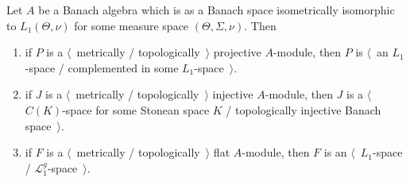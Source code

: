 \begin{proposition}\label{TopProjInjFlatModOverL1Charac} Let $A$ be a Banach
algebra which is as a Banach space isometrically isomorphic to $L_1(\Theta,\nu)$
for some measure space $(\Theta,\Sigma,\nu)$. Then

\begin{enumerate}[label = (\roman*)]
    \item if $P$ is a $\langle$~metrically / topologically~$\rangle$ projective
    $A$-module, then $P$ is $\langle$~an $L_1$-space / complemented in some
    $L_1$-space~$\rangle$.

    \item if $J$ is a $\langle$~metrically / topologically~$\rangle$ injective
    $A$-module, then  $J$ is a $\langle$~$C(K)$-space for some Stonean space $K$
    / topologically injective Banach space~$\rangle$.

    \item if $F$ is a $\langle$~metrically / topologically~$\rangle$ flat
    $A$-module, then $F$ is an $\langle$~$L_1$-space /
    $\mathscr{L}_1^g$-space~$\rangle$.
\end{enumerate}
\end{proposition}
